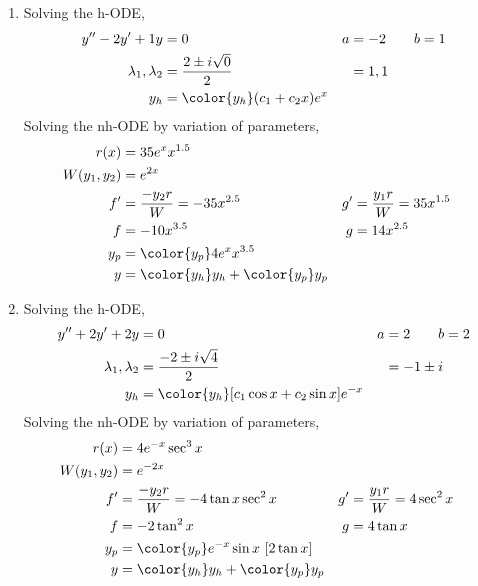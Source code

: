 \begin{enumerate}
    \item Solving the h-ODE,
          \begin{align}
              y'' - 2y' + 1y           & = 0                                   & a & = -2 \qquad b = 1 \\
              \lambda_{1}, \lambda_{2} & = \frac{2 \pm i\sqrt{0}}{2}           &   & = 1, 1            \\
              y_{h}                    & = {\color{y_h} (c_{1} + c_{2}x)e^{x}}
          \end{align}
          Solving the nh-ODE by variation of parameters,
          \begin{align}
              r(x)            & = 35e^{x}x^{1.5}                                                                  \\
              W(y_{1}, y_{2}) & = e^{2x}                                                                          \\
              f'              & = \frac{-y_{2}r}{W} = -35x^{2.5}            & g' & = \frac{y_{1}r}{W} = 35x^{1.5} \\
              f               & = -10x^{3.5}                                & g  & = 14x^{2.5}                    \\
              y_{p}           & = {\color{y_p} 4e^{x}x^{3.5}}                                                     \\
              y               & = {\color{y_h} y_{h}} + {\color{y_p} y_{p}}
          \end{align}

    \item Solving the h-ODE,
          \begin{align}
              y''  + 2y' + 2y          & = 0                                               & a & = 2 \qquad b = 2 \\
              \lambda_{1}, \lambda_{2} & = \frac{-2 \pm i\sqrt{4}}{2}                      &   & = -1 \pm i       \\
              y_{h}                    & = {\color{y_h} [c_{1}\cos x + c_{2}\sin x]e^{-x}}
          \end{align}
          Solving the nh-ODE by variation of parameters,
          \begin{align}
              r(x)            & = 4e^{-x}\sec ^{3}x                                                                 \\
              W(y_{1}, y_{2}) & = e^{-2x}                                                                           \\
              f'              & = \frac{-y_{2}r}{W} = -4\tan x \sec^{2}x    & g' & = \frac{y_{1}r}{W} = 4 \sec^{2}x \\
              f               & = -2\tan^{2}x                               & g  & = 4\tan x                        \\
              y_{p}           & = {\color{y_p} e^{-x}\sin x\ [2\tan x]}                                             \\
              y               & = {\color{y_h} y_{h}} + {\color{y_p} y_{p}}
          \end{align}


\end{enumerate}
